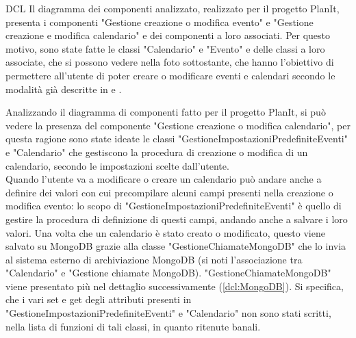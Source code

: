 \begin{listaPersonale}{DCL}
    Il diagramma dei componenti analizzato, realizzato per il progetto PlanIt, presenta i componenti "Gestione creazione o modifica evento" e "Gestione creazione e modifica calendario" e dei componenti a loro associati. Per questo motivo, sono state fatte le classi "Calendario" e "Evento" e delle classi a loro associate, che si possono vedere nella foto sottostante, che hanno l'obiettivo di permettere all'utente di poter creare o modificare eventi e calendari secondo le modalità già descritte in  e .
    \begin{center}
        
    \end{center}
    \newpage

    \begin{listaPersonale2}[DCL]{}
        Analizzando il diagramma di componenti fatto per il progetto PlanIt, si può vedere la presenza del componente "Gestione creazione o modifica calendario", per questa ragione sono state ideate le classi "GestioneImpostazioniPredefiniteEventi" e "Calendario"  che gestiscono la procedura di creazione o modifica di un calendario, secondo le impostazioni scelte dall'utente. \\
        Quando l'utente va a modificare o creare un calendario può andare anche a definire dei valori con cui precompilare alcuni campi presenti nella creazione o modifica evento: lo scopo di "GestioneImpostazioniPredefiniteEventi" è quello di gestire la procedura di definizione di questi campi, andando anche a salvare i loro valori. Una volta che un calendario è stato creato o modificato, questo viene salvato su MongoDB grazie alla classe "GestioneChiamateMongoDB" che lo invia al sistema esterno di archiviazione MongoDB (si noti l'associazione tra "Calendario" e "Gestione chiamate MongoDB).
        "GestioneChiamateMongoDB" viene presentato più nel dettaglio successivamente (\ref{dcl:MongoDB}).
        Si specifica, che i vari set e get degli attributi presenti in "GestioneImpostazioniPredefiniteEventi" e "Calendario" non sono stati scritti, nella lista di funzioni di tali classi, in quanto ritenute banali.



\end{listaPersonale2}
\end{listaPersonale}
